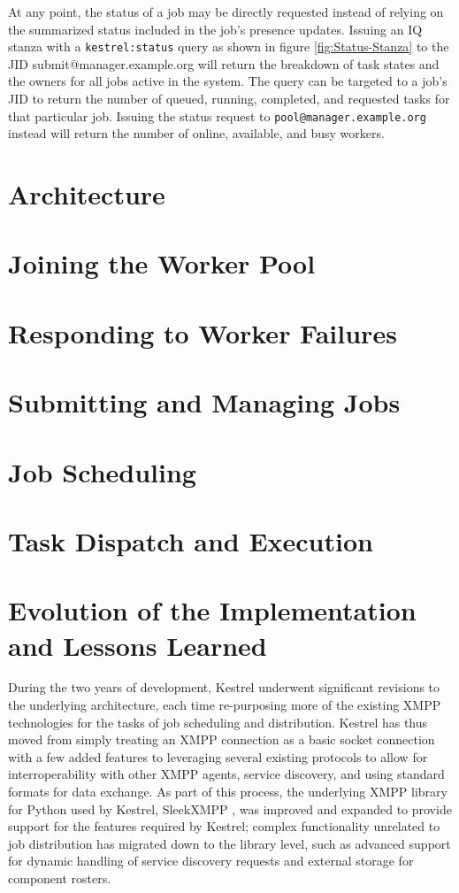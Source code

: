 At any point, the status of a job may be directly requested instead
of relying on the summarized status included in the job's presence
updates. Issuing an IQ stanza with a \texttt{kestrel:status} query
as shown in figure \ref{fig:Status-Stanza} to the JID submit@manager.example.org
will return the breakdown of task states and the owners for all jobs
active in the system. The query can be targeted to a job's JID to
return the number of queued, running, completed, and requested tasks
for that particular job. Issuing the status request to \texttt{pool@manager.example.org}
instead will return the number of online, available, and busy workers.

\section{Architecture}
\section{Joining the Worker Pool}
\section{Responding to Worker Failures}
\section{Submitting and Managing Jobs}
\section{Job Scheduling}
\section{Task Dispatch and Execution}

\section{Evolution of the Implementation and Lessons Learned}
\label{sec:Evolution}
During the two years of development, Kestrel underwent significant revisions
to the underlying architecture, each time re-purposing more of the existing
XMPP technologies for the tasks of job scheduling and distribution. Kestrel has
thus moved from simply treating an XMPP connection as a basic socket connection
with a few added features to leveraging several existing protocols to allow
for interroperability with other XMPP agents, service discovery, and using
standard formats for data exchange. As part of this process, the underlying XMPP
library for Python used by Kestrel, SleekXMPP \cite{SleekXMPP}, was improved
and expanded to provide support for the features required by Kestrel; complex
functionality unrelated to job distribution has migrated down to the library
level, such as advanced support for dynamic handling of service discovery
requests and external storage for component rosters.

